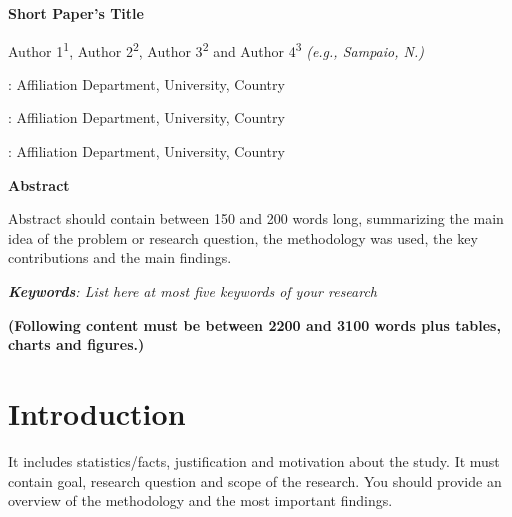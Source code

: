 \documentclass[a4paper]{article}
\begin{document}
\clearpage\setcounter{page}{1}%
\thispagestyle{FirstPage} %


\begin{center}
	\begin{LARGE}
		\textbf{Short Paper's Title}
	\end{LARGE}
\end{center}

\bigskip


{\centering
	Author 1\textsuperscript{1}, Author 2\textsuperscript{2}, Author 3\textsuperscript{2} and Author 4\textsuperscript{3
	}\textit{(e.g., Sampaio, N.)}\par}
\bigskip
{: Affiliation Department, University, Country 	 \par}
{: Affiliation Department, University, Country   \par}
{: Affiliation Department, University, Country   \par}

\bigskip

{\centering\bfseries\color{black}Abstract 
	\par}
Abstract should contain between 150 and 200 words long, summarizing the main idea of the problem or research question, the methodology was used, the key contributions and the main findings.
\textcolor{red}{\lipsum[1-1]}

\bigskip

\textit{\textbf{Keywords}: List here at most five keywords of your research }

\bigskip

{\centering\bfseries\color{red} (Following content must be between 2200 and 3100 words plus tables, charts and figures.) \par}%


\section[Introduction]{ Introduction}
It includes statistics/facts, justification and motivation about the study. It must contain goal, research question and
scope of the research. You should provide an overview of the methodology and the most important findings.
\textcolor{red}{\lipsum[1-1]}
\end{document}

